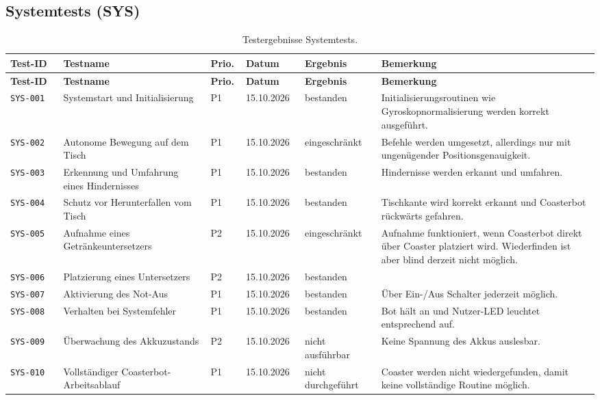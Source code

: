 \documentclass[
  a4paper,
  12pt,
  DIV=12,        %
  parskip=half,  %
  headings=small %
]{scrartcl}
\theoremstyle{definition}
\theoremstyle{definition}
\begin{document}
\begin{landscape}
\subsection{Systemtests (SYS)}\label{sys-ergebnisse}
\begin{longtable}[]{@{}
  p{0.09\linewidth}p{0.25\linewidth}p{0.06\linewidth}p{0.10\linewidth}p{0.13\linewidth}p{0.37\linewidth}@{}}
\caption{Testergebnisse Systemtests.}\\
\toprule
\textbf{Test-ID} & \textbf{Testname} & \textbf{Prio.} & \textbf{Datum} & \textbf{Ergebnis} & \textbf{Bemerkung}\\
\midrule
\endfirsthead
\toprule
\textbf{Test-ID} & \textbf{Testname} & \textbf{Prio.} & \textbf{Datum} & \textbf{Ergebnis} & \textbf{Bemerkung}\\
\midrule
\endhead
\bottomrule
\endfoot
\texttt{SYS-001} & Systemstart und Initialisierung & P1 & 15.10.2026 & bestanden & Initialisierungsroutinen wie Gyroskopnormalisierung werden korrekt ausgeführt. \\
\texttt{SYS-002} & Autonome Bewegung auf dem Tisch & P1 & 15.10.2026 & eingeschränkt & Befehle werden umgesetzt, allerdings nur mit ungenügender Positionsgenauigkeit. \\
\texttt{SYS-003} & Erkennung und Umfahrung eines Hindernisses & P1 & 15.10.2026 & bestanden & Hindernisse werden erkannt und umfahren.  \\
\texttt{SYS-004} & Schutz vor Herunterfallen vom Tisch & P1 & 15.10.2026 & bestanden & Tischkante wird korrekt erkannt und Coasterbot rückwärts gefahren. \\
\texttt{SYS-005} & Aufnahme eines Getränkeuntersetzers & P2 & 15.10.2026 & eingeschränkt & Aufnahme funktioniert, wenn Coasterbot direkt über Coaster platziert wird. Wiederfinden ist aber blind derzeit nicht möglich. \\
\texttt{SYS-006} & Platzierung eines Untersetzers & P2 & 15.10.2026 & bestanden & \\
\texttt{SYS-007} & Aktivierung des Not-Aus & P1 & 15.10.2026 & bestanden & Über Ein-/Aus Schalter jederzeit möglich.  \\
\texttt{SYS-008} & Verhalten bei Systemfehler & P1 & 15.10.2026 & bestanden & Bot hält an und Nutzer-LED leuchtet entsprechend auf.  \\
\texttt{SYS-009} & Überwachung des Akkuzustands & P2 & 15.10.2026 & nicht ausführbar & Keine Spannung des Akkus auslesbar. \\
\texttt{SYS-010} & Vollständiger Coasterbot-Arbeitsablauf & P1 & 15.10.2026 & nicht durchgeführt & Coaster werden nicht wiedergefunden, damit keine vollständige Routine möglich. \\
\end{longtable}
\end{landscape}
\end{document}
